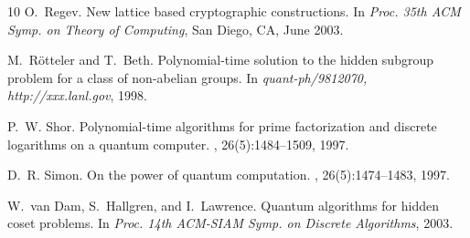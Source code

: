 \documentclass[11pt]{article}
\begin{document}
\begin{thebibliography}{10}
O.~Regev.
\newblock New lattice based cryptographic constructions.
\newblock In {\em Proc. 35th ACM Symp. on Theory of Computing}, San Diego, CA,
  June 2003.

M.~{R\"otteler} and T.~Beth.
\newblock Polynomial-time solution to the hidden subgroup problem for a class
  of non-abelian groups.
\newblock In {\em quant-ph/9812070, http://xxx.lanl.gov}, 1998.

P.~W. Shor.
\newblock Polynomial-time algorithms for prime factorization and discrete
  logarithms on a quantum computer.
, 26(5):1484--1509, 1997.

D.~R. Simon.
\newblock On the power of quantum computation.
, 26(5):1474--1483, 1997.

W.~van Dam, S.~Hallgren, and I.~Lawrence.
\newblock Quantum algorithms for hidden coset problems.
\newblock In {\em Proc. 14th ACM-SIAM Symp. on Discrete Algorithms}, 2003.

\end{thebibliography}
\end{document}
